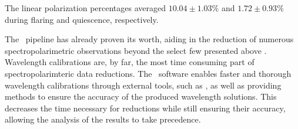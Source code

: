The linear polarization percentages averaged $10.04 \pm 1.03\%$ and $1.72 \pm 0.93\%$ during flaring and quiescence, respectively.

\pagebreak

The \stops\ pipeline has already proven its worth, aiding in the reduction of numerous spectropolarimetric observations beyond the select few presented above \citep[see e.g.,][]{Barnard_2024}.
Wavelength calibrations are, by far, the most time consuming part of spectropolarimteric data reductions.
The \stops\ software enables faster and thorough wavelength calibrations through external tools, such as \iraf, as well as providing methods to ensure the accuracy of the produced wavelength solutions.
This decreases the time necessary for reductions while still ensuring their accuracy, allowing the analysis of the results to take precedence.
